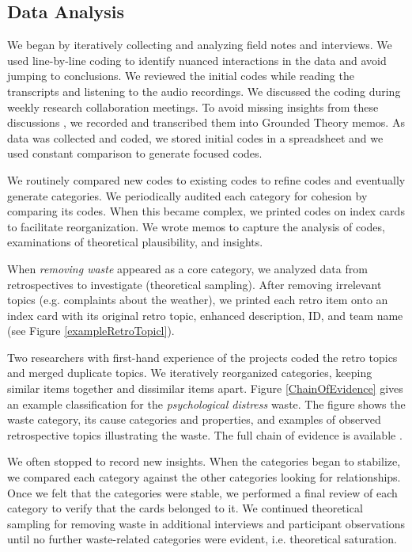 \subsection{Data Analysis}
We began by iteratively collecting and analyzing field notes and interviews. We used line-by-line coding \cite{Charmaz} to identify nuanced interactions in the data and avoid jumping to conclusions. We reviewed the initial codes while reading the transcripts and listening to the audio recordings. We discussed the coding during weekly research collaboration meetings. To avoid missing insights from these discussions \cite{GlaserTheoreticalSensitivity}, we recorded and transcribed them into Grounded Theory memos. As data was collected and coded, we stored initial codes in a spreadsheet and we used constant comparison to generate focused codes.

We routinely compared new codes to existing codes to refine codes and eventually generate categories. We periodically audited each category for cohesion by comparing its codes. When this became complex, we printed codes on index cards to facilitate reorganization. We wrote memos to capture the analysis of codes, examinations of theoretical plausibility, and insights.

When \textit{removing waste} appeared as a core category, we analyzed data from retrospectives to investigate (theoretical sampling). After removing irrelevant topics (e.g. complaints about the weather), we printed each retro item onto an index card with its original retro topic, enhanced description, ID, and team name (see Figure \ref{exampleRetroTopicl}).

Two researchers with first-hand experience of the projects coded the retro topics and merged duplicate topics. We iteratively reorganized categories, keeping similar items together and dissimilar items apart. Figure \ref{ChainOfEvidence} gives an example classification for the \textit{psychological distress} waste. The figure shows the waste category, its cause categories and properties, and examples of observed retrospective topics illustrating the waste. The full chain of evidence is available \cite{SedanoDissertation}. 

We often stopped to record new insights. When the categories began to stabilize, we compared each category against the other categories looking for relationships. Once we felt that the categories were stable, we performed a final review of each category to verify that the cards belonged to it. We continued theoretical sampling for removing waste in additional interviews and participant observations until no further waste-related categories were evident, i.e. theoretical saturation. 

